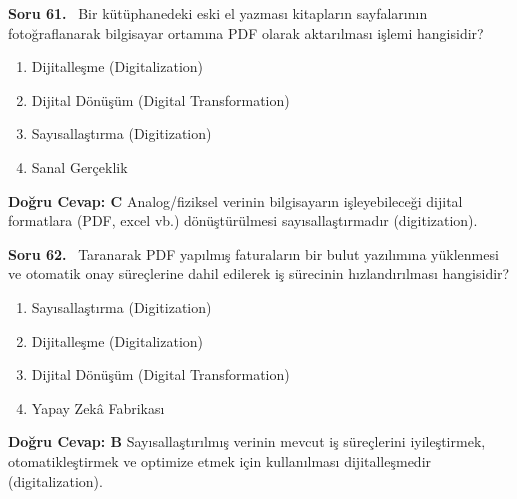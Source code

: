 \documentclass[11pt,a4paper,openany]{book}
\begin{document}
\needspace{5cm}
\vspace{8pt}
\noindent\textbf{\large\sffamily Soru 61.} \ Bir kütüphanedeki eski el yazması kitapların sayfalarının fotoğraflanarak bilgisayar ortamına PDF olarak aktarılması işlemi hangisidir?
\begin{enumerate}[label=\Alph*), leftmargin=25pt, topsep=4pt, itemsep=2pt]
    \item Dijitalleşme (Digitalization)
    \item Dijital Dönüşüm (Digital Transformation)
    \item Sayısallaştırma (Digitization)
    \item Sanal Gerçeklik
\end{enumerate}
\vspace{4pt}
\begin{tcolorbox}[title=Cevap ve Açıklama, colback=gray!3!white, colframe=primarycolor!90!black, arc=2mm, fonttitle=\bfseries\sffamily, top=6pt, bottom=6pt]
    \textbf{Doğru Cevap: C}
    \vspace{2pt}
    Analog/fiziksel verinin bilgisayarın işleyebileceği dijital formatlara (PDF, excel vb.) dönüştürülmesi sayısallaştırmadır (digitization).
\end{tcolorbox}
\vspace{10pt}

\needspace{5cm}
\vspace{8pt}
\noindent\textbf{\large\sffamily Soru 62.} \ Taranarak PDF yapılmış faturaların bir bulut yazılımına yüklenmesi ve otomatik onay süreçlerine dahil edilerek iş sürecinin hızlandırılması hangisidir?
\begin{enumerate}[label=\Alph*), leftmargin=25pt, topsep=4pt, itemsep=2pt]
    \item Sayısallaştırma (Digitization)
    \item Dijitalleşme (Digitalization)
    \item Dijital Dönüşüm (Digital Transformation)
    \item Yapay Zekâ Fabrikası
\end{enumerate}
\vspace{4pt}
\begin{tcolorbox}[title=Cevap ve Açıklama, colback=gray!3!white, colframe=primarycolor!90!black, arc=2mm, fonttitle=\bfseries\sffamily, top=6pt, bottom=6pt]
    \textbf{Doğru Cevap: B}
    \vspace{2pt}
    Sayısallaştırılmış verinin mevcut iş süreçlerini iyileştirmek, otomatikleştirmek ve optimize etmek için kullanılması dijitalleşmedir (digitalization).
\end{tcolorbox}
\vspace{10pt}
\end{document}
